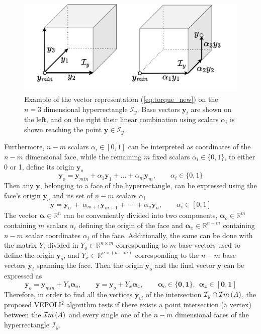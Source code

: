 \begin{figure}
    \centering
    \includegraphics[width=0.6\linewidth]{Papers/images/navigation_y.pdf}
    \caption{Example of the vector representation (\ref{eq:torque_new}) on the $n\!=\!3$ dimensional hyperrectangle $\mathcal{I}_y$. Base vectors $\bm{y}_i$ are shown on the left, and on the right their linear combination using scalars $\alpha_i$ is shown reaching the point $\bm{y}\in\mathcal{I}_y$.}
    \label{fig:navigation_y}
\end{figure}
Furthermore, $n-m$ scalars $\alpha_i\in[0,1]$ can be interpreted as coordinates of the $n-m$ dimensional face, while the remaining $m$ fixed scalars $\alpha_i\in\{0,1\}$, to either 0 or 1, define its origin $\bm{y}_o$
\begin{equation}
    \bm{y}_o = \bm{y}_{min} + \alpha_1 \bm{y}_1+ ... + \alpha_m \bm{y}_m, \qquad \alpha_i \in\{0,1\}
\end{equation} 
Then any $\bm{y}$, belonging to a face of the hyperrectangle, can be expressed using the face's origin $\bm{y}_o$ and its set of $n-m$ scalars $\alpha_i$ 
\begin{equation}
    \bm{y} = \bm{y}_o ~+ ~\alpha_{m+1}\bm{y}_{m+1} +~\cdots~ +\alpha_{n}\bm{y}_{n}, \qquad \alpha_i \in [0,1]
\end{equation}
The vector $\bm{\alpha}\in\mathbb{R}^n$ can be conveniently divided into two components, $\bm{\alpha}_o\in\mathbb{R}^m$ containing $m$ scalars $\alpha_i$ defining the origin of the face and $\bm{\alpha}_x\in\mathbb{R}^{n-m}$ containing $n-m$ scalar coordinates $\alpha_i$ of the face. Additionally, the same can be done with the matrix $Y$, divided in $Y_o\in\mathbb{R}^{n\times m}$ corresponding to $m$ base vectors used to define the origin $\bm{y}_o$, and $Y_x\in\mathbb{R}^{n\times (n-m)}$
 corresponding to the $n\!-\!m$ base vectors $\bm{y}_i$ spanning the face. Then the origin $\bm{y}_o$ and the final vector $\bm{y}$ can be expressed as
 \begin{equation}
    \bm{y}_o = \bm{y}_{min} + Y_o\bm{\alpha}_{o}, \qquad \bm{y} = \bm{y}_o +  Y_x\bm{\alpha}_{x}, \qquad \bm{\alpha}_{o}\in\{\bm{0},\bm{1}\},~~ \bm{\alpha}_{x}\in[\bm{0},\bm{1}]
    \label{eq:matrix_new_y}
\end{equation}
Therefore, in order to find all the vertices $\bm{y}_{vi}$ of the intersection $\mathcal{I}_y\cap\mathcal{I}m\left(A\right)$, the proposed VEPOLI$^2$ algorithm tests if there exists a point intersection (a vertex) between the $\mathcal{I}m\left(A\right)$ and every single one of the $n-m$ dimensional faces of the hyperrectangle $\mathcal{I}_y$.

